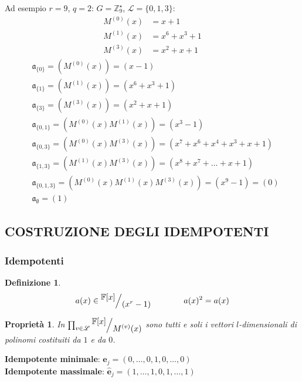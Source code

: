 \documentclass[mathserif]{beamer}
\def\quotient#1#2{%
   \raise1ex\hbox{$#1$}\Big/\lower1ex\hbox{$#2$}%
}
\newtheorem{definizione}{Definizione}
\newtheorem{prop}{Proprietà}
\begin{document}
\thispagestyle{empty}
\begin{frame}
   \vspace{-1.3cm}
     Ad esempio $r = 9$, $q = 2$: $ G = \mathbb{Z}_{9}^{\star} $, $\mathscr{L} = \lbrace 0,1,3 \rbrace$:
      \begin{align*}
	  M^{(0)}(x) &= x+1 \\
	  M^{(1)}(x) &= x^6+x^3+1 \\
	  M^{(3)}(x) &= x^2+x+1
      \end{align*}
      \begin{align*}
	  &\mathfrak{a}_{\lbrace 0 \rbrace} = (M^{(0)}(x)) = (x-1) \\
	  &\mathfrak{a}_{\lbrace 1 \rbrace} = (M^{(1)}(x)) = (x^6+x^3+1) \\
	  &\mathfrak{a}_{\lbrace 3 \rbrace} = (M^{(3)}(x)) = (x^2+x+1) \\
	  &\mathfrak{a}_{\lbrace 0,1 \rbrace} = (M^{(0)}(x)M^{(1)}(x)) = (x^3 -1) \\
	  &\mathfrak{a}_{\lbrace 0,3 \rbrace} = (M^{(0)}(x)M^{(3)}(x)) = (x^7 + x^6 + x^4 + x^3 + x + 1) \\
	  &\mathfrak{a}_{\lbrace 1,3 \rbrace}
			= (M^{(1)}(x)M^{(3)}(x)) = (x^8 + x^7 + \dots + x + 1) \\
	  &\mathfrak{a}_{\lbrace 0,1,3 \rbrace} = (M^{(0)}(x)M^{(1)}(x)M^{(3)}(x)) = (x^9 -1) = (0) \\
	  &\mathfrak{a}_{\emptyset} = (1)
      \end{align*}
\end{frame}


\subsection{COSTRUZIONE DEGLI IDEMPOTENTI}
\begin{frame}
  \frametitle{Idempotenti}
  \begin{definizione}
     $ $  %
     \begin{align*}
        a(x) \in \quotient{\mathbb{F} \lbrack x \rbrack  }{ (x^{r} - 1)} \qquad \qquad a(x)^2 = a(x)
     \end{align*}
  \end{definizione}
  \pause
    \begin{prop}
      In $\prod_{v\in \mathscr{L}} \quotient{\mathbb{F} \lbrack x \rbrack  }{M^{(v)}(x)}$
      sono tutti e soli i vettori $l$-dimensionali di polinomi costituiti da $1$ e da $0$.
    \end{prop}
    {\bf Idempotente minimale}: $  \mathbf{e}_{j} = (0, \dots, 0,1,0, \dots, 0)$ \\
    {\bf Idempotente massimale}: $  \mathbf{\hat{e}}_{j} = (1, \dots, 1,0,1, \dots, 1)$
\end{frame}
\end{document}
